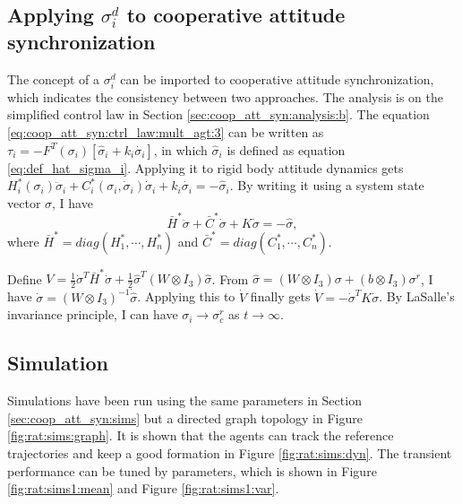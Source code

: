 
\subsection{Applying $ \sigma^{d}_{i} $ to cooperative attitude synchronization}
\label{sec:ref_att_trk:analysis}

The concept of a $ \sigma^{d}_{i} $ can be imported to cooperative attitude synchronization, which indicates the consistency between two approaches.
The analysis is on the simplified control law in Section \ref{sec:coop_att_syn:analysis:b}.
The equation \eqref{eq:coop_att_syn:ctrl_law:mult_agt:3} can be written as
$ \tau_{i} = - F^{T}(\sigma_{i}) [ \hat{ \sigma }_{i} + k_{i} \dot{ \sigma_{i} } ] $, in which $ \hat{ \sigma }_{i} $ is defined as equation \eqref{eq:def_hat_sigma_i}.
Applying it to rigid body attitude dynamics gets 
$ H^{*}_{i} ( \sigma_{i} ) \ddot{\sigma}_{i} + C^{*}_{i} ( \sigma_{i} , \dot{ \sigma }_{i} ) \dot{ \sigma }_{i}+ k_{i} \dot{ \sigma_{i} } = - \hat{ \sigma }_{i} $.
By writing it using a system state vector $ \sigma $, I have
\begin{equation}
\bar{H}^{*} \ddot{\sigma} + \bar{C}^{*} \dot{\sigma} + K \dot{\sigma} = - \hat{\sigma},
\end{equation}
where $ \bar{H}^{*} = diag( H^{*}_{1} , \cdots , H^{*}_{n} ) $ and $ \bar{C}^{*} = diag( C^{*}_{1} , \cdots , C^{*}_{n} ) $.

Define $ V = \frac{1}{2} \dot{ \sigma }^{T} \bar{H}^{*} \dot{ \sigma } + \frac{1}{2} \hat{\sigma}^{T} ( W \otimes I_{3} ) \hat{\sigma} $.
From $ \hat{\sigma} = ( W \otimes I_{3} ) \sigma + ( b \otimes I_{3} ) \sigma^{r} $, I have $ \dot{\sigma} = ( W \otimes I_{3} )^{-1} \dot{\hat{\sigma}} $.
Applying this to $ \dot{V} $ finally gets $ \dot{V} = - \dot{\sigma}^{T} K \dot{\sigma} $.
By LaSalle's invariance principle, I can have $ \sigma_{i} \rightarrow \sigma^{r}_{c} $ as $ t \rightarrow \infty $. 

\subsection{Simulation}

Simulations have been run using the same parameters in Section \ref{sec:coop_att_syn:sims} but a directed graph topology in Figure \ref{fig:rat:sims:graph}.
It is shown that the agents can track the reference trajectories and keep a good formation in Figure \ref{fig:rat:sims:dyn}.
The transient performance can be tuned by parameters, which is shown in Figure \ref{fig:rat:sims1:mean} and Figure \ref{fig:rat:sims1:var}.

